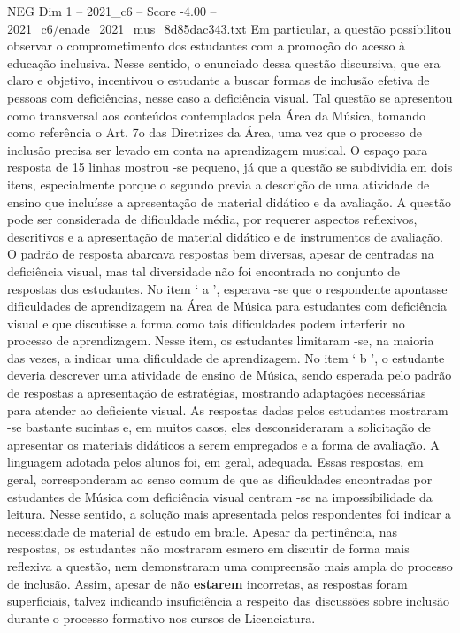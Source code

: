 \begin{textsample}{NEG Dim 1 – 2021\_c6 – Score -4.00 – 2021\_c6/enade\_2021\_mus\_8d85dac343.txt}
Em particular, a questão possibilitou observar o comprometimento dos estudantes com a promoção do acesso à educação inclusiva.
Nesse sentido, o enunciado dessa questão discursiva, que era claro e objetivo, incentivou o estudante a buscar formas de inclusão efetiva de pessoas com deficiências, nesse caso a deficiência visual.
Tal questão se apresentou como transversal aos conteúdos contemplados pela Área da Música, tomando como referência o Art. 7o das Diretrizes da Área, uma vez que o processo de inclusão precisa ser levado em conta na aprendizagem musical.
O espaço para resposta de 15 linhas mostrou -se pequeno, já que a questão se subdividia em dois itens, especialmente porque o segundo previa a descrição de uma atividade de ensino que incluísse a apresentação de material didático e da avaliação.
A questão pode ser considerada de dificuldade média, por requerer aspectos reflexivos, descritivos e a apresentação de material didático e de instrumentos de avaliação.
O padrão de resposta abarcava respostas bem diversas, apesar de centradas na deficiência visual, mas tal diversidade não foi encontrada no conjunto de respostas dos estudantes.
No item ‘ a ’, esperava -se que o respondente apontasse dificuldades de aprendizagem na Área de Música para estudantes com deficiência visual e que discutisse a forma como tais dificuldades podem interferir no processo de aprendizagem.
Nesse item, os estudantes limitaram -se, na maioria das vezes, a indicar uma dificuldade de aprendizagem.
No item ‘ b ’, o estudante deveria descrever uma atividade de ensino de Música, sendo esperada pelo padrão de respostas a apresentação de estratégias, mostrando adaptações necessárias para atender ao deficiente visual.
As respostas dadas pelos estudantes mostraram -se bastante sucintas e, em muitos casos, eles desconsideraram a solicitação de apresentar os materiais didáticos a serem empregados e a forma de avaliação.
A linguagem adotada pelos alunos foi, em geral, adequada.
Essas respostas, em geral, corresponderam ao senso comum de que as dificuldades encontradas por estudantes de Música com deficiência visual centram -se na impossibilidade da leitura.
Nesse sentido, a solução mais apresentada pelos respondentes foi indicar a necessidade de material de estudo em braile.
Apesar da pertinência, nas respostas, os estudantes não mostraram esmero em discutir de forma mais reflexiva a questão, nem demonstraram uma compreensão mais ampla do processo de inclusão.
Assim, apesar de não \textbf{estarem} incorretas, as respostas foram superficiais, talvez indicando insuficiência a respeito das discussões sobre inclusão durante o processo formativo nos cursos de Licenciatura.

\end{textsample}
